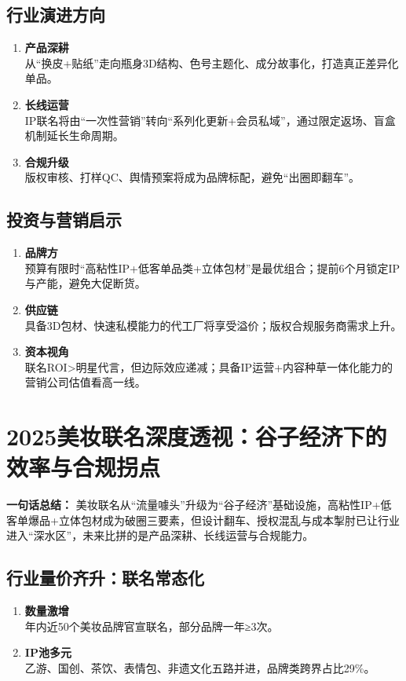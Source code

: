 \subsection{行业演进方向}
\begin{enumerate}[leftmargin=*, nosep]
    \item \textbf{产品深耕}  \\
    从“换皮+贴纸”走向瓶身3D结构、色号主题化、成分故事化，打造真正差异化单品。
    \item \textbf{长线运营}  \\
    IP联名将由“一次性营销”转向“系列化更新+会员私域”，通过限定返场、盲盒机制延长生命周期。
    \item \textbf{合规升级}  \\
    版权审核、打样QC、舆情预案将成为品牌标配，避免“出圈即翻车”。
\end{enumerate}

\subsection{投资与营销启示}
\begin{enumerate}[leftmargin=*, nosep]
    \item \textbf{品牌方}  \\
    预算有限时“高粘性IP+低客单品类+立体包材”是最优组合；提前6个月锁定IP与产能，避免大促断货。
    \item \textbf{供应链}  \\
    具备3D包材、快速私模能力的代工厂将享受溢价；版权合规服务商需求上升。
    \item \textbf{资本视角}  \\
    联名ROI>明星代言，但边际效应递减；具备IP运营+内容种草一体化能力的营销公司估值看高一线。
\end{enumerate}

\section{2025美妆联名深度透视：谷子经济下的效率与合规拐点}
\textbf{一句话总结：}  
美妆联名从“流量噱头”升级为“谷子经济”基础设施，高粘性IP+低客单爆品+立体包材成为破圈三要素，但设计翻车、授权混乱与成本掣肘已让行业进入“深水区”，未来比拼的是产品深耕、长线运营与合规能力。

\subsection{行业量价齐升：联名常态化}
\begin{enumerate}[leftmargin=*, nosep]
    \item \textbf{数量激增}  \\
    年内近50个美妆品牌官宣联名，部分品牌一年≥3次。
    \item \textbf{IP池多元}  \\
    乙游、国创、茶饮、表情包、非遗文化五路并进，品牌类跨界占比29\%。
\end{enumerate}

